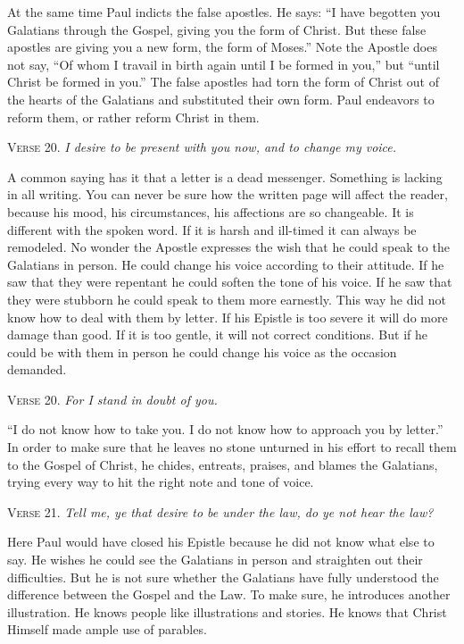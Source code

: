 At the same time Paul indicts the false apostles. He says: “I have begotten you Galatians through the Gospel, giving you the form of Christ. But these false apostles are giving you a new form, the form of Moses.” Note the Apostle does not say, “Of whom I travail in birth again until I be formed in you,” but “until Christ be formed in you.” The false apostles had torn the form of Christ out of the hearts of the Galatians and substituted their own form. Paul endeavors to reform them, or rather reform Christ in them.

\textsc{Verse} 20. \emph{I desire to be present with you now, and to change my voice.}

A common saying has it that a letter is a dead messenger. Something is lacking in all writing. You can never be sure how the written page will affect the reader, because his mood, his circumstances, his affections are so changeable. It is different with the spoken word. If it is harsh and ill-timed it can always be remodeled. No wonder the Apostle expresses the wish that he could speak to the Galatians in person. He could change his voice according to their attitude. If he saw that they were repentant he could soften the tone of his voice. If he saw that they were stubborn he could speak to them more earnestly. This way he did not know how to deal with them by letter. If his Epistle is too severe it will do more damage than good. If it is too gentle, it will not correct conditions. But if he could be with them in person he could change his voice as the occasion demanded.

\textsc{Verse} 20. \emph{For I stand in doubt of you.}

“I do not know how to take you. I do not know how to approach you by letter.” In order to make sure that he leaves no stone unturned in his effort to recall them to the Gospel of Christ, he chides, entreats, praises, and blames the Galatians, trying every way to hit the right note and tone of voice.

\textsc{Verse} 21. \emph{Tell me, ye that desire to be under the law, do ye not hear the law?}

Here Paul would have closed his Epistle because he did not know what else to say. He wishes he could see the Galatians in person and straighten out their difficulties. But he is not sure whether the Galatians have fully understood the difference between the Gospel and the Law. To make sure, he introduces another illustration. He knows people like illustrations and stories. He knows that Christ Himself made ample use of parables.

